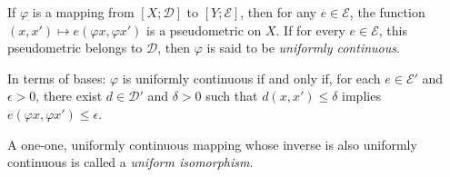 If $\varphi$ is a mapping from $[X; \mathcal{D}]$ to $[Y; \mathcal{E}]$, then for any $e \in \mathcal{E}$, the function $(x, x') \mapsto e(\varphi x, \varphi x')$ is a pseudometric on $X$. If for every $e \in \mathcal{E}$, this pseudometric belongs to $\mathcal{D}$, then $\varphi$ is said to be \textit{uniformly continuous}.

In terms of bases: $\varphi$ is uniformly continuous if and only if, for each $e \in \mathcal{E}'$ and $\epsilon > 0$, there exist $d \in \mathcal{D}'$ and $\delta > 0$ such that $d(x, x') \leq \delta$ implies $e(\varphi x, \varphi x') \leq \epsilon$.

A one-one, uniformly continuous mapping whose inverse is also uniformly continuous is called a \textit{uniform isomorphism}.
